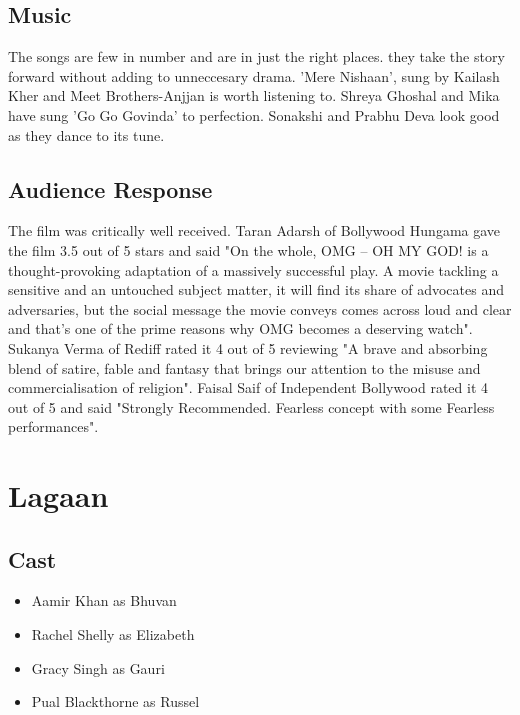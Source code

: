 \documentclass[a4paper]{article}
\begin{document}
\subsection{Music }
The songs are few in number and are in just the right places. they take the story forward without adding to unneccesary drama. 'Mere Nishaan', sung by Kailash Kher and Meet Brothers-Anjjan is worth listening to. Shreya Ghoshal and Mika have sung 'Go Go Govinda' to perfection. Sonakshi and Prabhu Deva look good as they dance to its tune. 

\subsection{Audience Response}
	   
	The film was critically well received.
Taran Adarsh of Bollywood Hungama gave the film 3.5 out of 5 stars and said "On the whole, OMG – OH MY GOD! is a thought-provoking adaptation of a massively successful play. A movie tackling a sensitive and an untouched subject matter, it will find its share of advocates and adversaries, but the social message the movie conveys comes across loud and clear and that's one of the prime reasons why OMG becomes a deserving watch". Sukanya Verma of Rediff rated it 4 out of 5 reviewing "A brave and absorbing blend of satire, fable and fantasy that brings our attention to the misuse and commercialisation of religion". Faisal Saif of Independent Bollywood rated it 4 out of 5 and said "Strongly Recommended. Fearless concept with some Fearless performances".   	        
	        
	   
	
	

	  \section{Lagaan }
	  \subsection {Cast}
	  \begin{itemize}
\item Aamir Khan as Bhuvan
\item Rachel Shelly as Elizabeth
\item Gracy Singh as Gauri
\item Pual Blackthorne as Russel
\end{itemize}
\end{document}
